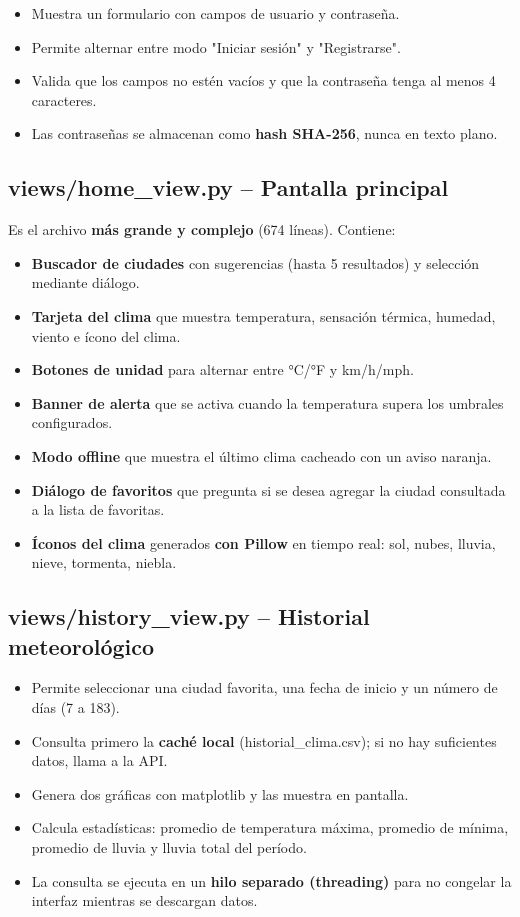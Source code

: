 \documentclass[12pt,a4paper]{article}
\begin{document}
\begin{itemize}
    \item Muestra un formulario con campos de usuario y contraseña.
    \item Permite alternar entre modo "Iniciar sesión" y "Registrarse".
    \item Valida que los campos no estén vacíos y que la contraseña tenga al menos 4 caracteres.
    \item Las contraseñas se almacenan como \textbf{hash SHA-256}, nunca en texto plano.
\end{itemize}

\subsection{views/home\_view.py -- Pantalla principal}

Es el archivo \textbf{más grande y complejo} (674 líneas). Contiene:

\begin{itemize}
    \item \textbf{Buscador de ciudades} con sugerencias (hasta 5 resultados) y selección mediante diálogo.
    \item \textbf{Tarjeta del clima} que muestra temperatura, sensación térmica, humedad, viento e ícono del clima.
    \item \textbf{Botones de unidad} para alternar entre °C/°F y km/h/mph.
    \item \textbf{Banner de alerta} que se activa cuando la temperatura supera los umbrales configurados.
    \item \textbf{Modo offline} que muestra el último clima cacheado con un aviso naranja.
    \item \textbf{Diálogo de favoritos} que pregunta si se desea agregar la ciudad consultada a la lista de favoritas.
    \item \textbf{Íconos del clima} generados \textbf{con Pillow} en tiempo real: sol, nubes, lluvia, nieve, tormenta, niebla.
\end{itemize}

\subsection{views/history\_view.py -- Historial meteorológico}

\begin{itemize}
    \item Permite seleccionar una ciudad favorita, una fecha de inicio y un número de días (7 a 183).
    \item Consulta primero la \textbf{caché local} (historial\_clima.csv); si no hay suficientes datos, llama a la API.
    \item Genera dos gráficas con matplotlib y las muestra en pantalla.
    \item Calcula estadísticas: promedio de temperatura máxima, promedio de mínima, promedio de lluvia y lluvia total del período.
    \item La consulta se ejecuta en un \textbf{hilo separado (threading)} para no congelar la interfaz mientras se descargan datos.
\end{itemize}
\end{document}
